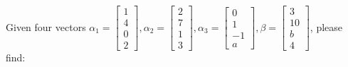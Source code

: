 \question Given four vectors $\alpha_1=\displaystyle\begin{bmatrix}
    1 \\ 4 \\ 0 \\ 2
\end{bmatrix}, \alpha_2=\displaystyle\begin{bmatrix}
    2 \\ 7 \\ 1 \\ 3
\end{bmatrix}, \alpha_3=\displaystyle\begin{bmatrix}
    0 \\ 1 \\ -1 \\ a
\end{bmatrix}, \beta=\displaystyle\begin{bmatrix}
    3 \\ 10 \\ b \\ 4
\end{bmatrix}$, please find:

